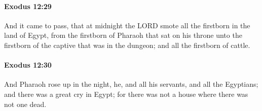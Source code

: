 		\paragraph{Exodus 12:29} %
			\label{EXODUS-12-29}

			And it came to pass, that at midnight the LORD smote all the firstborn in the land of Egypt, from the firstborn of Pharaoh that sat on his throne unto the firstborn of the captive that was in the dungeon; and all the firstborn of cattle.


		\paragraph{Exodus 12:30} %
			\label{EXODUS-12-30}

			And Pharaoh rose up in the night, he, and all his servants, and all the Egyptians; and there was a great cry in Egypt; for there was not a house where there was not one dead.

